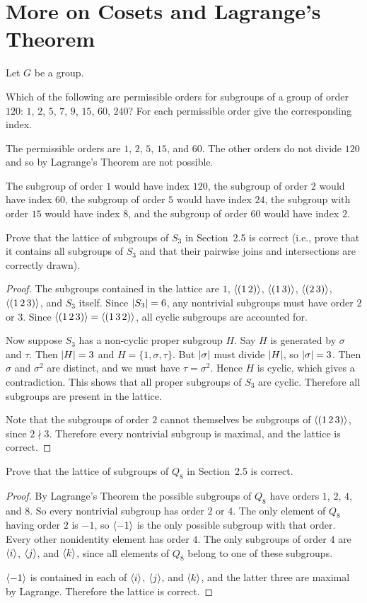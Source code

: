 \section{More on Cosets and Lagrange's Theorem}

Let $G$ be a group.

 Which of the following are permissible orders for subgroups
of a group of order $120$: $1$, $2$, $5$, $7$, $9$, $15$, $60$, $240$?
For each permissible order give the corresponding index.
\begin{solution}
  The permissible orders are $1$, $2$, $5$, $15$, and $60$. The other
  orders do not divide $120$ and so by Lagrange's Theorem are not
  possible.

  The subgroup of order $1$ would have index $120$, the subgroup of
  order $2$ would have index $60$, the subgroup of order $5$ would
  have index $24$, the subgroup with order $15$ would have index $8$,
  and the subgroup of order $60$ would have index $2$.
\end{solution}

 Prove that the lattice of subgroups of $S_3$ in Section~2.5
is correct (i.e., prove that it contains all subgroups of $S_3$ and
that their pairwise joins and intersections are correctly drawn).
\begin{proof}
  The subgroups contained in the lattice are $1$, $\langle{(1\,2)}\rangle$,
  $\langle{(1\,3)}\rangle$, $\langle{(2\,3)}\rangle$, $\langle{(1\,2\,3)}\rangle$, and $S_3$
  itself. Since $\lvert{S_3}\rvert = 6$, any nontrivial subgroups must have
  order $2$ or $3$. Since $\langle{(1\,2\,3)}\rangle = \langle{(1\,3\,2)}\rangle$, all
  cyclic subgroups are accounted for.

  Now suppose $S_3$ has a non-cyclic proper subgroup $H$. Say $H$ is
  generated by $\sigma$ and $\tau$. Then $\lvert{H}\rvert = 3$ and
  $H = \{1, \sigma, \tau\}$. But $\lvert{\sigma}\rvert$ must divide $\lvert{H}\rvert$,
  so $\lvert{\sigma}\rvert = 3$. Then $\sigma$ and $\sigma^2$ are distinct,
  and we must have $\tau = \sigma^2$. Hence $H$ is cyclic, which gives
  a contradiction. This shows that all proper subgroups of $S_3$ are
  cyclic. Therefore all subgroups are present in the lattice.

  Note that the subgroups of order $2$ cannot themselves be subgroups
  of $\langle{(1\,2\,3)}\rangle$, since $2\nmid3$. Therefore every nontrivial
  subgroup is maximal, and the lattice is correct.
\end{proof}

 Prove that the lattice of subgroups of $Q_8$ in Section~2.5
is correct.
\begin{proof}
  By Lagrange's Theorem the possible subgroups of $Q_8$ have orders
  $1$, $2$, $4$, and $8$. So every nontrivial subgroup has order $2$
  or $4$. The only element of $Q_8$ having order $2$ is $-1$, so
  $\langle{-1}\rangle$ is the only possible subgroup with that order. Every
  other nonidentity element has order $4$. The only subgroups of order
  $4$ are $\langle{i}\rangle$, $\langle{j}\rangle$, and $\langle{k}\rangle$, since all elements of
  $Q_8$ belong to one of these subgroups.

  $\langle{-1}\rangle$ is contained in each of $\langle{i}\rangle$, $\langle{j}\rangle$, and
  $\langle{k}\rangle$, and the latter three are maximal by Lagrange. Therefore
  the lattice is correct.
\end{proof}

